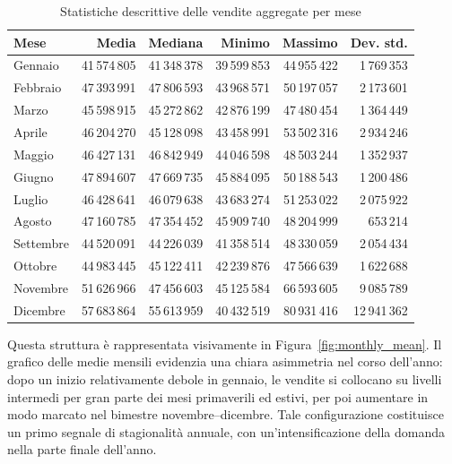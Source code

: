 \documentclass[a4paper,12pt]{article}
\begin{document}
\begin{table}[H]
\centering
\caption{Statistiche descrittive delle vendite aggregate per mese}
\label{tab:monthly_summary}
\begin{tabular}{lrrrrr}
\toprule
\textbf{Mese} & \textbf{Media} & \textbf{Mediana} & \textbf{Minimo} & \textbf{Massimo} & \textbf{Dev. std.} \\
\midrule
Gennaio   & 41\,574\,805 & 41\,348\,378 & 39\,599\,853 & 44\,955\,422 & 1\,769\,353 \\
Febbraio  & 47\,393\,991 & 47\,806\,593 & 43\,968\,571 & 50\,197\,057 & 2\,173\,601 \\
Marzo     & 45\,598\,915 & 45\,272\,862 & 42\,876\,199 & 47\,480\,454 & 1\,364\,449 \\
Aprile    & 46\,204\,270 & 45\,128\,098 & 43\,458\,991 & 53\,502\,316 & 2\,934\,246 \\
Maggio    & 46\,427\,131 & 46\,842\,949 & 44\,046\,598 & 48\,503\,244 & 1\,352\,937 \\
Giugno    & 47\,894\,607 & 47\,669\,735 & 45\,884\,095 & 50\,188\,543 & 1\,200\,486 \\
Luglio    & 46\,428\,641 & 46\,079\,638 & 43\,683\,274 & 51\,253\,022 & 2\,075\,922 \\
Agosto    & 47\,160\,785 & 47\,354\,452 & 45\,909\,740 & 48\,204\,999 & 653\,214 \\
Settembre & 44\,520\,091 & 44\,226\,039 & 41\,358\,514 & 48\,330\,059 & 2\,054\,434 \\
Ottobre   & 44\,983\,445 & 45\,122\,411 & 42\,239\,876 & 47\,566\,639 & 1\,622\,688 \\
Novembre  & 51\,626\,966 & 47\,456\,603 & 45\,125\,584 & 66\,593\,605 & 9\,085\,789 \\
Dicembre  & 57\,683\,864 & 55\,613\,959 & 40\,432\,519 & 80\,931\,416 & 12\,941\,362 \\
\bottomrule
\end{tabular}
\end{table}

Questa struttura è rappresentata visivamente in Figura~\ref{fig:monthly_mean}. Il grafico delle medie mensili evidenzia una chiara asimmetria nel corso dell’anno: dopo un inizio relativamente debole in gennaio, le vendite si collocano su livelli intermedi per gran parte dei mesi primaverili ed estivi, per poi aumentare in modo marcato nel bimestre novembre--dicembre. Tale configurazione costituisce un primo segnale di stagionalità annuale, con un’intensificazione della domanda nella parte finale dell’anno.
\end{document}
